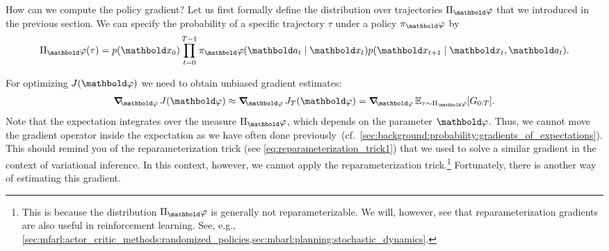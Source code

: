 How can we compute the policy gradient?
Let us first formally define the distribution over trajectories $\altpi_\vvarphi$ that we introduced in the previous section.
We can specify the probability of a specific trajectory $\tau$ under a policy $\pi_\vvarphi$ by \begin{align}
  \altpi_\vvarphi(\tau)  = p(\vx_0) \prod_{t=0}^{T-1} \pi_\vvarphi(\va_t \mid \vx_t) p(\vx_{t+1} \mid \vx_t, \va_t). \label{eq:trajectory_distr}
\end{align}

For optimizing $\j{\vvarphi}$ we need to obtain unbiased gradient estimates: \begin{align}
  \grad_\vvarphi \j{\vvarphi} \approx \grad_\vvarphi \j{\vvarphi}[T] = \grad_\vvarphi \E[\tau \sim \altpi_\vvarphi]{G_{0:T}}.
\end{align}
Note that the expectation integrates over the measure $\altpi_\vvarphi$, which depends on the parameter $\vvarphi$.
Thus, we cannot move the gradient operator inside the expectation as we have often done previously~(cf.~\cref{sec:background:probability:gradients_of_expectations}).
This should remind you of the reparameterization trick (see \cref{eq:reparameterization_trick1}) that we used to solve a similar gradient in the context of variational inference.
In this context, however, we cannot apply the reparameterization trick.\footnote{This is because the distribution $\altpi_\vvarphi$ is generally not reparameterizable.
We will, however, see that reparameterization gradients are also useful in reinforcement learning. See, e.g., \cref{sec:mfarl:actor_critic_methods:randomized_policies,sec:mbarl:planning:stochastic_dynamics}.}
Fortunately, there is another way of estimating this gradient.


